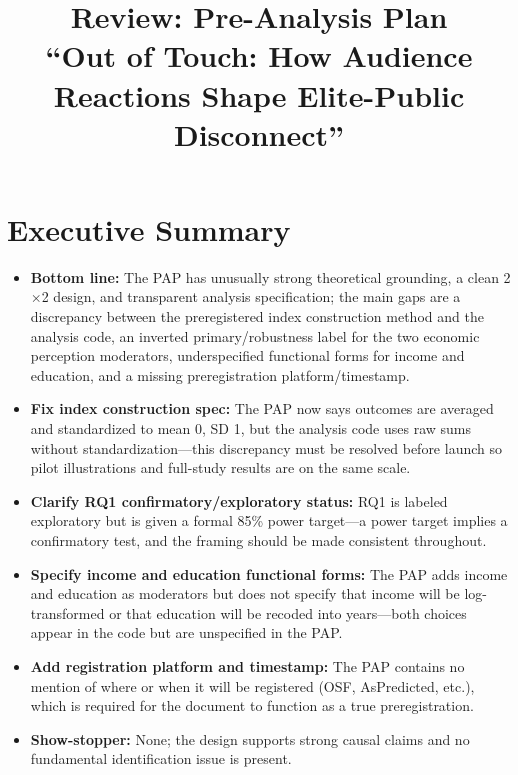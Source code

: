 \documentclass[11pt]{article}
\title{\textbf{Review: Pre-Analysis Plan}\\
\large ``Out of Touch: How Audience Reactions Shape Elite-Public Disconnect''}
\author{}
\date{}
\begin{document}
\maketitle

\section{Executive Summary}

\begin{itemize}
  \item \textbf{Bottom line:} The PAP has unusually strong theoretical grounding, a clean 2$\times$2 design, and transparent analysis specification; the main gaps are a discrepancy between the preregistered index construction method and the analysis code, an inverted primary/robustness label for the two economic perception moderators, underspecified functional forms for income and education, and a missing preregistration platform/timestamp.

  \item \textbf{Fix index construction spec:} The PAP now says outcomes are averaged and standardized to mean 0, SD 1, but the analysis code uses raw sums without standardization---this discrepancy must be resolved before launch so pilot illustrations and full-study results are on the same scale.

  \item \textbf{Clarify RQ1 confirmatory/exploratory status:} RQ1 is labeled exploratory but is given a formal 85\% power target---a power target implies a confirmatory test, and the framing should be made consistent throughout.

  \item \textbf{Specify income and education functional forms:} The PAP adds income and education as moderators but does not specify that income will be log-transformed or that education will be recoded into years---both choices appear in the code but are unspecified in the PAP.

  \item \textbf{Add registration platform and timestamp:} The PAP contains no mention of where or when it will be registered (OSF, AsPredicted, etc.), which is required for the document to function as a true preregistration.

  \item \textbf{Show-stopper:} None; the design supports strong causal claims and no fundamental identification issue is present.
\end{itemize}
\end{document}
